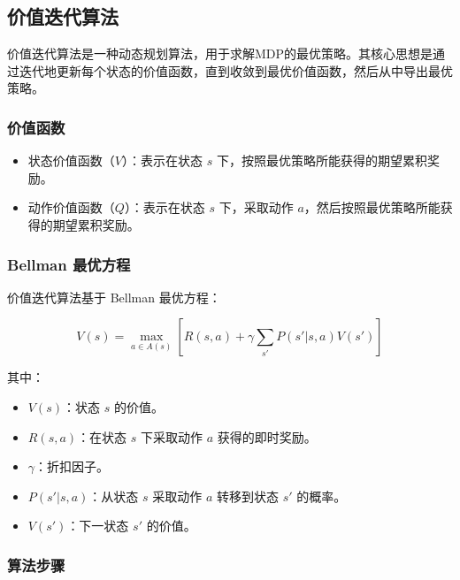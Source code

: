 \documentclass{article}
\begin{document}
\subsection{价值迭代算法}
价值迭代算法是一种动态规划算法，用于求解MDP的最优策略。其核心思想是通过迭代地更新每个状态的价值函数，直到收敛到最优价值函数，然后从中导出最优策略。

\subsubsection{价值函数}
\begin{itemize}
    \item 状态价值函数（$V$）：表示在状态 $s$ 下，按照最优策略所能获得的期望累积奖励。
    \item 动作价值函数（$Q$）：表示在状态 $s$ 下，采取动作 $a$，然后按照最优策略所能获得的期望累积奖励。
\end{itemize}

\subsubsection{Bellman 最优方程}
价值迭代算法基于 Bellman 最优方程：

\[
V(s) = \max_{a \in A(s)} \left[ R(s, a) + \gamma \sum_{s'} P(s' | s, a) V(s') \right]
\]

其中：
\begin{itemize}
    \item $V(s)$：状态 $s$ 的价值。
    \item $R(s, a)$：在状态 $s$ 下采取动作 $a$ 获得的即时奖励。
    \item $\gamma$：折扣因子。
    \item $P(s' | s, a)$：从状态 $s$ 采取动作 $a$ 转移到状态 $s'$ 的概率。
    \item $V(s')$：下一状态 $s'$ 的价值。
\end{itemize}

\subsubsection{算法步骤}
\end{document}
